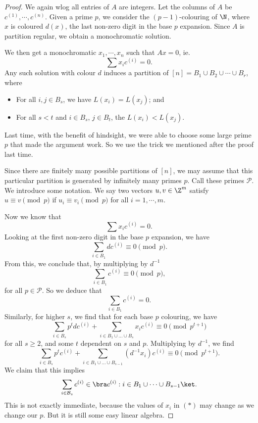 \documentclass[a4paper]{article}
\begin{document}
\begin{proof}
  We again wlog all entries of $A$ are integers. Let the columns of $A$ be $c^{(1)}, \cdots, c^{(n)}$. Given a prime $p$, we consider the $(p - 1)$-colouring of $\N$, where $x$ is coloured $d(x)$, the last non-zero digit in the base $p$ expansion. Since $A$ is partition regular, we obtain a monochromatic solution.

  We then get a monochromatic $x_1, \cdots, x_n$ such that $Ax = 0$, ie.
  \[
    \sum x_i c^{(i)} = 0.
  \]
  Any such solution with colour $d$ induces a partition of $[n] = B_1 \cup B_2 \cup \cdots \cup B_r$, where
  \begin{itemize}
    \item For all $i, j \in B_s$, we have $L(x_i) = L(x_j)$; and
    \item For all $s < t$ and $i \in B_s$, $j \in B_t$, the $L(x_i) < L(x_j)$.
  \end{itemize}
  Last time, with the benefit of hindsight, we were able to choose some large prime $p$ that made the argument work. So we use the trick we mentioned after the proof last time.

  Since there are finitely many possible partitions of $[n]$, we may assume that this particular partition is generated by infinitely many primes $p$. Call these primes $\mathcal{P}$. We introduce some notation. We say two vectors $u, v \in \Z^m$ satisfy $u \equiv v \pmod p$ if $u_i \equiv v_i \pmod p$ for all $i = 1, \cdots, m$.

  Now we know that
  \[
    \sum x_i c^{(i)} = 0.
  \]
  Looking at the first non-zero digit in the base $p$ expansion, we have
  \[
    \sum_{i \in B_1} d c^{(i)} \equiv 0 \pmod p.
  \]
  From this, we conclude that, by multiplying by $d^{-1}$
  \[
    \sum_{i \in B_1} c^{(i)} \equiv 0 \pmod p,
  \]
  for all $p \in \mathcal{P}$. So we deduce that
  \[
    \sum_{i \in B_1} c^{(i)} = 0.
  \]
  Similarly, for higher $s$, we find that for each base $p$ colouring, we have
  \[
    \sum_{i \in B_s} p^t d c^{(i)} + \sum_{i \in B_1 \cup \ldots \cup B_s} x_i c^{(i)} \equiv 0 \pmod {p^{t + 1}}
  \]
  for all $s \geq 2$, and some $t$ dependent on $s$ and $p$. Multiplying by $d^{-1}$, we find
  \[
    \sum_{i \in B_s} p^t c^{(i)} + \sum_{i \in B_1 \cup \ldots \cup B_{s - 1}} (d^{-1} x_i) c^{(i)} \equiv 0 \pmod {p^{t + 1}}.\tag{$*$}
  \]
  We claim that this implies
  \[
    \sum_{i \in \mathcal{B}_s} c^{(i)} \in \bra c^{(i)}: i \in B_1 \cup \cdots \cup B_{s - 1}\ket.
  \]
  This is not exactly immediate, because the values of $x_i$ in $(*)$ may change as we change our $p$. But it is still some easy linear algebra.


\end{proof}
\end{document}
